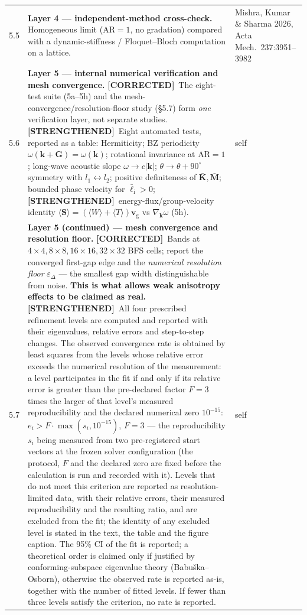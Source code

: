 \documentclass[11pt,a4paper]{article}
\newcommand{\STR}{{\color{strcol}\textbf{[STRENGTHENED]}}}
\newcommand{\COR}{{\color{corcol}\textbf{[CORRECTED]}}}
\begin{document}
\begin{xltabular}{\textwidth}{@{}L{1.5cm} Y L{3.4cm}@{}}
5.5 & \textbf{Layer 4 --- independent-method cross-check.} Homogeneous limit ($\mathrm{AR}=1$, no gradation) compared with a dynamic-stiffness / Floquet--Bloch computation on a lattice. & Mishra, Kumar \& Sharma 2026, Acta Mech.\ 237:3951--3982 \\
5.6 & \textbf{Layer 5 --- internal numerical verification and mesh convergence.} \COR\ The eight-test suite (5a--5h) and the mesh-convergence/resolution-floor study (\S5.7) form \emph{one} verification layer, not separate studies. \STR\ Eight automated tests, reported as a table: Hermiticity; BZ periodicity $\omega(\bm k+\bm G)=\omega(\bm k)$; rotational invariance at $\mathrm{AR}=1$; long-wave acoustic slope $\omega\to c|\bm k|$; $\theta\!\to\!\theta\!+\!90^\circ$ symmetry with $l_1\leftrightarrow l_2$; positive definiteness of $\bar{\bm K},\bar{\bm M}$; bounded phase velocity for $\bar\ell_{\mathrm i}>0$; \STR\ energy-flux/group-velocity identity $\langle\bm S\rangle=(\langle W\rangle+\langle T\rangle)\bm v_{\mathrm g}$ vs $\nabla_{\bm k}\omega$ (5h). & self \\
5.7 & \textbf{Layer 5 (continued) --- mesh convergence and resolution floor.} \COR\ Bands at $4{\times}4,8{\times}8,16{\times}16,32{\times}32$ BFS cells; report the converged first-gap edge and the \emph{numerical resolution floor} $\varepsilon_\Delta$ --- the smallest gap width distinguishable from noise. \textbf{This is what allows weak anisotropy effects to be claimed as real.} \STR\ All four prescribed refinement levels are computed and reported with their eigenvalues, relative errors and step-to-step changes. The observed convergence rate is obtained by least squares from the levels whose relative error exceeds the numerical resolution of the measurement: a level participates in the fit if and only if its relative error is greater than the pre-declared factor $F = 3$ times the larger of that level's measured reproducibility and the declared numerical zero $10^{-15}$: $e_i > F \cdot \max(s_i, 10^{-15})$, $F = 3$ --- the reproducibility $s_i$ being measured from two pre-registered start vectors at the frozen solver configuration (the protocol, $F$ and the declared zero are fixed before the calculation is run and recorded with it). Levels that do not meet this criterion are reported as resolution-limited data, with their relative errors, their measured reproducibility and the resulting ratio, and are excluded from the fit; the identity of any excluded level is stated in the text, the table and the figure caption. The 95\% CI of the fit is reported; a theoretical order is claimed only if justified by conforming-subspace eigenvalue theory (Babu\v{s}ka--Osborn), otherwise the observed rate is reported as-is, together with the number of fitted levels. If fewer than three levels satisfy the criterion, no rate is reported. & self \\
\bottomrule
\end{xltabular}
\end{document}
